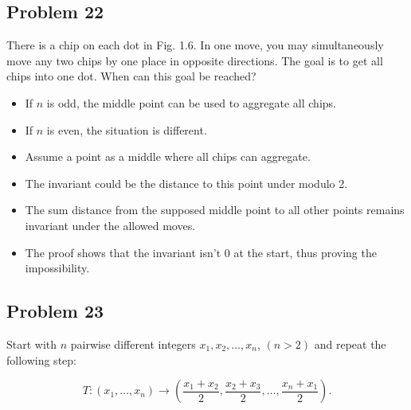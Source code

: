 \documentclass[12pt,tikz,border=10pt]{article}
\theoremstyle{definition}
\theoremstyle{remark}
\begin{document}
\subsection{Problem 22}
There is a chip on each dot in Fig. 1.6. In one move, you may simultaneously move
any two chips by one place in opposite directions. The goal is to get all chips into
one dot. When can this goal be reached?

\begin{itemize}
    \item If $n$ is odd, the middle point can be used to aggregate all chips.
    \item If $n$ is even, the situation is different.
    \item Assume a point as a middle where all chips can aggregate.
    \item The invariant could be the distance to this point under modulo 2.
    \item The sum distance from the supposed middle point to all other points remains invariant under the allowed moves.
    \item The proof shows that the invariant isn't 0 at the start, thus proving the impossibility.
\end{itemize}

\subsection{Problem 23}
Start with $n$ pairwise different integers $x_1, x_2, \ldots, x_n$, $(n > 2)$ and repeat the following step:

\[
T : (x_1, \ldots, x_n) \rightarrow \left(\frac{x_1 + x_2}{2}, \frac{x_2 + x_3}{2}, \ldots, \frac{x_n + x_1}{2}\right).
\]
\end{document}
